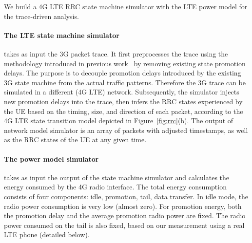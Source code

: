 

\label{sec:model}
We build a 4G LTE RRC state machine simulator with the LTE power model for the trace-driven analysis.

\paragraph{The LTE state machine simulator} takes as input the 3G packet trace. It first preprocesses the trace using the methodology introduced in previous work~\cite{imc.3g} by removing existing state promotion delays. The purpose is to decouple promotion delays introduced by the existing 3G state machine from the actual traffic patterns. Therefore the 3G trace can be simulated in a different (4G LTE) network. Subsequently, the simulator injects new promotion delays into the trace, then infers the RRC states experienced by the UE based on the timing, size, and direction of each packet, according to the 4G LTE state transition model depicted in Figure~\ref{fig:rrc}(b). The output of network model simulator is an array of packets with adjusted timestamps, as well as the RRC states of the UE at any given time.

\paragraph{The power model simulator} takes as input the output of the state machine simulator and calculates the energy consumed by the 4G radio interface. The total energy consumption consists of four components: idle, promotion, tail, data transfer. In idle mode, the radio power consumption is very low (almost zero). For promotion energy, both the promotion delay and the average promotion radio power are fixed. The radio power consumed on the tail is also fixed, based on our measurement using a real LTE phone (detailed below).


